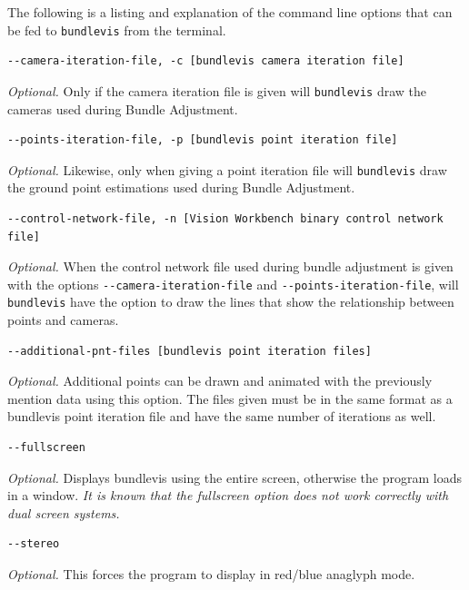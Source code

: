 The following is a listing and explanation of the command line options
that can be fed to \texttt{bundlevis} from the terminal.

\begin{verbatim}
--camera-iteration-file, -c [bundlevis camera iteration file]
\end{verbatim}

\emph{Optional.} Only if the camera iteration file is given will
\texttt{bundlevis} draw the cameras used during Bundle Adjustment.

\begin{verbatim}
--points-iteration-file, -p [bundlevis point iteration file]
\end{verbatim}

\emph{Optional.} Likewise, only when giving a point iteration file
will \texttt{bundlevis} draw the ground point estimations used during
Bundle Adjustment.

\begin{verbatim}
--control-network-file, -n [Vision Workbench binary control network file]
\end{verbatim}

\emph{Optional.} When the control network file used during bundle
adjustment is given with the options \verb=--camera-iteration-file=
and \verb=--points-iteration-file=, will \texttt{bundlevis} have the
option to draw the lines that show the relationship between points and
cameras.

\begin{verbatim}
--additional-pnt-files [bundlevis point iteration files]
\end{verbatim}

\emph{Optional.} Additional points can be drawn and animated with the
previously mention data using this option. The files given must be in
the same format as a bundlevis point iteration file and have the same
number of iterations as well.

\begin{verbatim}
--fullscreen
\end{verbatim}

\emph{Optional.} Displays bundlevis using the entire screen, otherwise
the program loads in a window. \emph{It is known that the fullscreen
  option does not work correctly with dual screen systems.}

\begin{verbatim}
--stereo
\end{verbatim}

\emph{Optional.} This forces the program to display in red/blue anaglyph mode.

